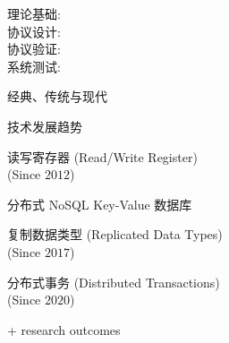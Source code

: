 
\begin{frame}{}
	\begin{columns}[c]
	\end{columns}

	\begin{center}
	\end{center}
\end{frame}

\begin{frame}{}
	\begin{columns}[c]
	\end{columns}
\end{frame}

\begin{frame}{}
	\begin{description}
		\item[理论基础:]
		\item[协议设计:]
		\item[协议验证:]
		\item[系统测试:]
	\end{description}
\end{frame}

\begin{frame}{}
	经典、传统与现代

	技术发展趋势
\end{frame}

\begin{frame}{}
	\begin{center}
		读写寄存器 (Read/Write Register) \\[6pt]
		(Since $2012$)

		分布式 NoSQL Key-Value 数据库
	\end{center}
\end{frame}

\begin{frame}{}
	\begin{center}
		复制数据类型 (Replicated Data Types) \\[6pt]
		(Since $2017$)

	\end{center}
\end{frame}

\begin{frame}{}
	\begin{center}
		分布式事务 (Distributed Transactions) \\[6pt]
		(Since $2020$)

		+ research outcomes
	\end{center}
\end{frame}

